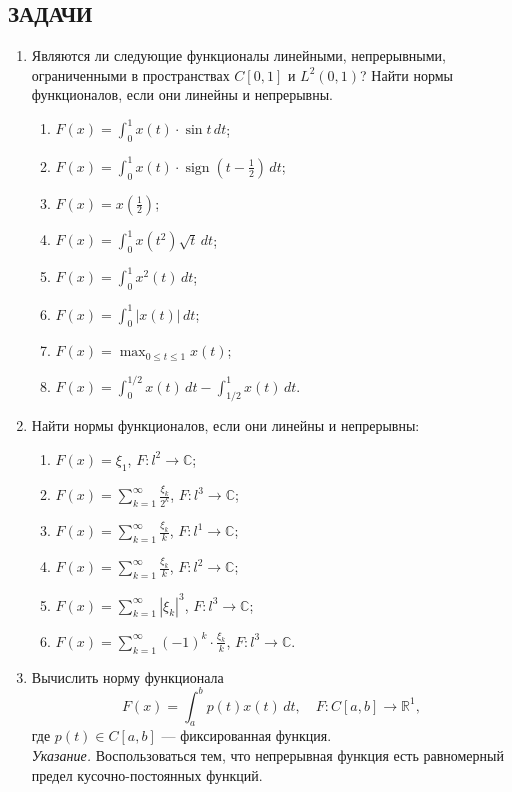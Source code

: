 \documentclass[12pt,a4paper]{article}
\begin{document}
\subsection*{ЗАДАЧИ}
\begin{enumerate}
\item Являются ли следующие функционалы линейными, непрерывными, ограниченными в пространствах $C[0,1]$ и $L^{2}(0,1)$? Найти нормы функционалов, если они линейны и непрерывны.
\begin{enumerate}[label=\alph*)]
\item $F(x) = \int_{0}^{1} x(t) \cdot \sin t \, dt$;
\item $F(x) = \int_{0}^{1} x(t) \cdot \operatorname{sign}(t - \frac{1}{2}) \, dt$;
\item $F(x) = x(\frac{1}{2})$;
\item $F(x) = \int_{0}^{1} x(t^{2}) \sqrt{t} \, dt$;
\item $F(x) = \int_{0}^{1} x^{2}(t) \, dt$;
\item $F(x) = \int_{0}^{1} |x(t)| \, dt$;
\item $F(x) = \max_{0 \le t \le 1} x(t)$;
\item $F(x) = \int_{0}^{1/2} x(t) \, dt - \int_{1/2}^{1} x(t) \, dt$.
\end{enumerate}

\item Найти нормы функционалов, если они линейны и непрерывны:
\begin{enumerate}[label=\alph*)]
\item $F(x) = \xi_{1}$, $F: l^{2} \rightarrow \mathbb{C}$;
\item $F(x) = \sum_{k=1}^{\infty} \frac{\xi_{k}}{2^{k}}$, $F: l^{3} \rightarrow \mathbb{C}$;
\item $F(x) = \sum_{k=1}^{\infty} \frac{\xi_{k}}{k}$, $F: l^{1} \rightarrow \mathbb{C}$;
\item $F(x) = \sum_{k=1}^{\infty} \frac{\xi_{k}}{k}$, $F: l^{2} \rightarrow \mathbb{C}$;
\item $F(x) = \sum_{k=1}^{\infty} |\xi_{k}|^{3}$, $F: l^{3} \rightarrow \mathbb{C}$;
\item $F(x) = \sum_{k=1}^{\infty} (-1)^{k} \cdot \frac{\xi_{k}}{k}$, $F: l^{3} \rightarrow \mathbb{C}$.
\end{enumerate}

\item Вычислить норму функционала
$$F(x) = \int_{a}^{b} p(t)x(t) \, dt, \quad F: C[a,b] \rightarrow \mathbb{R}^{1},$$
где $p(t) \in C[a,b]$ — фиксированная функция.\\
\textit{Указание.} Воспользоваться тем, что непрерывная функция есть равномерный предел кусочно-постоянных функций.


\end{enumerate}
\end{document}
